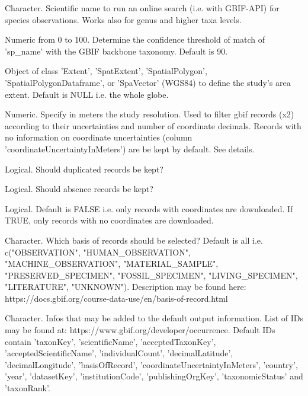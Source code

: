 \documentclass[a4paper]{book}
\begin{document}
\begin{Arguments}
\begin{ldescription}
\item[\code{sp\_name}] Character. Scientific name to run an online search
(i.e. with GBIF-API) for species observations. Works also for genus and higher taxa
levels.

\item[\code{conf\_match}] Numeric from 0 to 100. Determine the confidence threshold of match
of 'sp\_name' with the GBIF backbone taxonomy. Default is 90.

\item[\code{geo}] Object of class 'Extent', 'SpatExtent', 'SpatialPolygon', 'SpatialPolygonDataframe',
or 'SpaVector' (WGS84) to define the study's area extent. Default is NULL i.e. the whole globe.

\item[\code{grain}] Numeric. Specify in meters the study resolution. Used to
filter gbif records (x2) according to their uncertainties and number of coordinate
decimals. Records with no information on coordinate uncertainties (column
'coordinateUncertaintyInMeters') are be kept by default. See details.

\item[\code{duplicates}] Logical. Should duplicated records be kept?

\item[\code{absences}] Logical. Should absence records be kept?

\item[\code{no\_xy}] Logical. Default is FALSE i.e. only records with coordinates are
downloaded. If TRUE, only records with no coordinates are downloaded.

\item[\code{basis}] Character. Which basis of records should be selected?
Default is all i.e. c("OBSERVATION", "HUMAN\_OBSERVATION", "MACHINE\_OBSERVATION",
"MATERIAL\_SAMPLE", "PRESERVED\_SPECIMEN", "FOSSIL\_SPECIMEN", "LIVING\_SPECIMEN", "LITERATURE",
"UNKNOWN"). Description may be found here: https://docs.gbif.org/course-data-use/en/basis-of-record.html

\item[\code{add\_infos}] Character. Infos that may be added to the default output information.
List of IDs may be found at: https://www.gbif.org/developer/occurrence.
Default IDs contain 'taxonKey', 'scientificName', 'acceptedTaxonKey',
'acceptedScientificName', 'individualCount', 'decimalLatitude', 'decimalLongitude',
'basisOfRecord', 'coordinateUncertaintyInMeters', 'country', 'year', 'datasetKey', 
'institutionCode', 'publishingOrgKey', 'taxonomicStatus' and 'taxonRank'.


\end{ldescription}
\end{Arguments}
\end{document}
